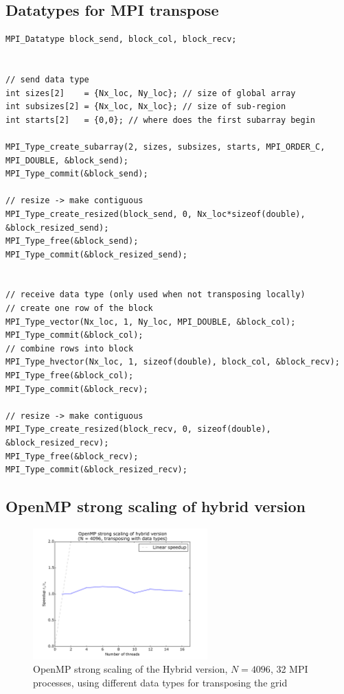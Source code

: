 \documentclass[a4paper]{article}
\begin{document}
\subsection{Datatypes for MPI transpose}\label{sec:lst-datatypes-transpose}
\begin{lstlisting}[label={lst:datatypes-transpose}, caption={MPI data types for transposing the grid}]
MPI_Datatype block_send, block_col, block_recv;


// send data type
int sizes[2]    = {Nx_loc, Ny_loc}; // size of global array
int subsizes[2] = {Nx_loc, Nx_loc}; // size of sub-region
int starts[2]   = {0,0}; // where does the first subarray begin

MPI_Type_create_subarray(2, sizes, subsizes, starts, MPI_ORDER_C, MPI_DOUBLE, &block_send);
MPI_Type_commit(&block_send);

// resize -> make contiguous
MPI_Type_create_resized(block_send, 0, Nx_loc*sizeof(double), &block_resized_send);
MPI_Type_free(&block_send);
MPI_Type_commit(&block_resized_send);


// receive data type (only used when not transposing locally)
// create one row of the block
MPI_Type_vector(Nx_loc, 1, Ny_loc, MPI_DOUBLE, &block_col);
MPI_Type_commit(&block_col);
// combine rows into block
MPI_Type_hvector(Nx_loc, 1, sizeof(double), block_col, &block_recv);
MPI_Type_free(&block_col);
MPI_Type_commit(&block_recv);

// resize -> make contiguous
MPI_Type_create_resized(block_recv, 0, sizeof(double), &block_resized_recv);
MPI_Type_free(&block_recv);
MPI_Type_commit(&block_resized_recv);
\end{lstlisting}

\subsection{OpenMP strong scaling of hybrid version}
\begin{figure}[h]
	\centering
	\includegraphics[width=0.6\textwidth]{hybrid_strong_scaling_omp_4096.pdf}
	\caption{OpenMP strong scaling of the Hybrid version, $N = 4096$, 32 MPI processes, using different data types for transposing the grid}
	\label{fig:hybrid-strong-scaling-omp}
\end{figure}



\clearpage


\end{document}
